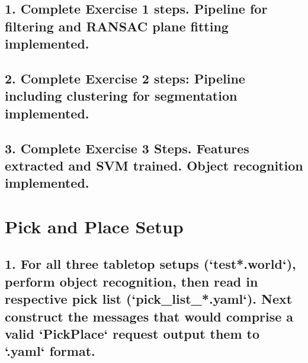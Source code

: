 \documentclass{article}
\begin{document}
\subsection{1. Complete Exercise 1 steps. Pipeline for filtering and RANSAC plane fitting implemented.}

\subsection{2. Complete Exercise 2 steps: Pipeline including clustering for segmentation implemented.}

\subsection{3. Complete Exercise 3 Steps.  Features extracted and SVM trained.  Object recognition implemented.}


\section{Pick and Place Setup}

\subsection{1. For all three tabletop setups (`test*.world`), perform object recognition, then read in respective pick list (`pick\_list\_*.yaml`). Next construct the messages that would comprise a valid `PickPlace` request output them to `.yaml` format.}


\end{document}
